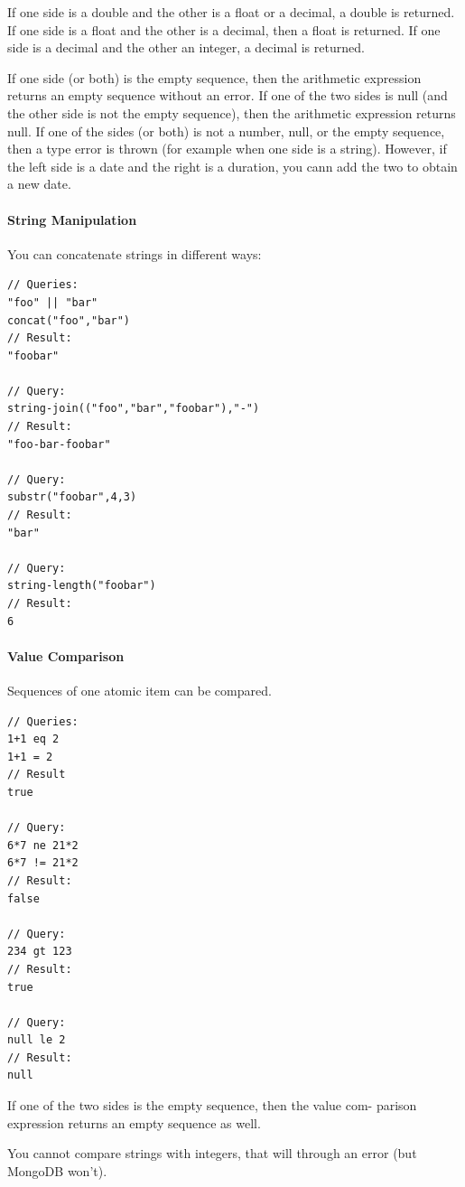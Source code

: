 If one side is a double and the other is a float or a decimal, a double is returned. If one side is a float and the other is a decimal, then a float is returned. If one side is a decimal and the other an integer, a decimal is returned.

If one side (or both) is the empty sequence, then the arithmetic expression returns an empty sequence without an error. If one of the two sides is null (and the other side is not the empty sequence), then the arithmetic expression returns null. If one of the sides (or both) is not a number, null, or the empty sequence, then a type error is thrown (for example when one side is a string). However, if the left side is a date and the right is a duration, you cann add the two to obtain a new date.

\paragraph{String Manipulation}
You can concatenate strings in different ways:
\begin{lstlisting}[style=json]
// Queries:
"foo" || "bar"
concat("foo","bar")
// Result:
"foobar"

// Query:
string-join(("foo","bar","foobar"),"-")
// Result:
"foo-bar-foobar"

// Query:
substr("foobar",4,3)
// Result:
"bar"

// Query:
string-length("foobar")
// Result:
6
\end{lstlisting}

\paragraph{Value Comparison}
Sequences of one atomic item can be compared.
\begin{lstlisting}[style=json]
// Queries:
1+1 eq 2
1+1 = 2
// Result
true

// Query:
6*7 ne 21*2
6*7 != 21*2
// Result:
false

// Query:
234 gt 123
// Result:
true

// Query:
null le 2
// Result:
null
\end{lstlisting}

If one of the two sides is the empty sequence, then the value com- parison expression returns an empty sequence as well.

You cannot compare strings with integers, that will through an error (but MongoDB won't).


